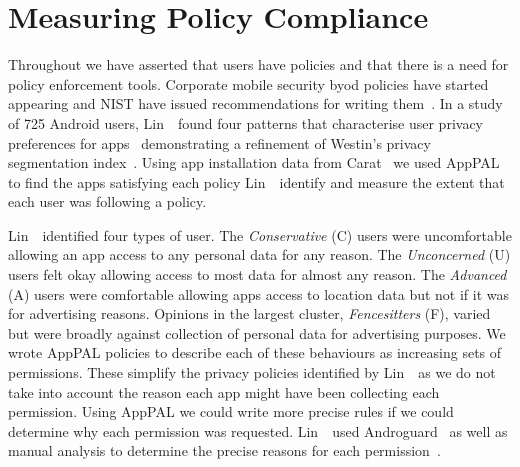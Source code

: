 \documentclass[]{llncs}
\begin{document}
\section{Measuring Policy Compliance}
\label{sec:demonstation}

Throughout we have asserted that users have policies and that there is a need for policy enforcement tools.
Corporate mobile security \ac{byod} policies have started appearing and NIST have issued recommendations for writing them~\cite{Scarfone:2009vy,Souppaya:2013jf}.
In a study of 725 Android users, Lin~\etal~found four patterns that characterise user privacy preferences for apps~\cite{Sadeh:2014vq} demonstrating a refinement of Westin's privacy segmentation index~\cite{Krane:2002jo}.
Using app installation data from Carat~\cite{Oliner:2013ht,Chia:2012gz} we used AppPAL to find the apps satisfying each policy Lin~\etal~identify and measure the extent that each user was following a policy.

Lin~\etal~identified four types of user.
The \emph{Conservative} (C) users were uncomfortable allowing an app access to any personal data for any reason.
The \emph{Unconcerned} (U) users felt okay allowing access to most data for almost any reason.
The \emph{Advanced} (A) users were comfortable allowing apps access to location data but not if it was for advertising reasons.
Opinions in the largest cluster, \emph{Fencesitters} (F), varied but were broadly against collection of personal data for advertising purposes.
We wrote AppPAL policies to describe each of these behaviours as increasing sets of permissions.
These simplify the privacy policies identified by Lin~\etal~as we do not take into account the reason each app might have been collecting each permission.
Using AppPAL we could write more precise rules if we could determine why each permission was requested.
Lin~\etal~used Androguard~\cite{Desnos:ub} as well as manual analysis to determine the precise reasons for each permission~\cite{Sadeh:2014vq}.
\end{document}
